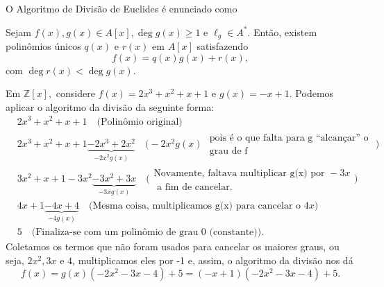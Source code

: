 \documentclass[../algebraIII_notes.tex]{subfiles}
\begin{document}
\begin{tcolorbox}[
		skin=enhanced,
		title=Lembrete!,
		after title={\hfill Algoritmo da Divisão de Euclides},
		fonttitle=\bfseries,
		sharp corners=downhill,
		colframe=black,
		colbacktitle=yellow!75!white,
		colback=yellow!30,
		colbacklower=black,
		coltitle=black,
		drop large lifted shadow
	]
	O \hypertarget{euclides_algorithm}{Algoritmo de Divisão de Euclides} é enunciado como
	\begin{theorem*}
		Sejam \(f(x), g(x)\in A[x], \deg{g(x)}\geq 1\) e \(\ell_{g}\in A^{*}.\) Então,
		existem polinômios únicos \(q(x)\) e \(r(x)\) em \(A[x]\) satisfazendo
		\[
			f(x) = q(x)g(x) + r(x),
		\]
		com \(\deg{r(x)} < \deg{g(x)}.\)
	\end{theorem*}
	\begin{example}
		Em \(\mathbb{Z}[x],\) considere \(f(x) = 2x^{3} + x^{2} + x + 1\)  e \(g(x) = -x + 1.\)
		Podemos aplicar o algoritmo da divisão da seguinte forma:
		\begin{align*}
			 & 2x^{3} + x^{2} + x + 1\quad \text{(Polinômio original)}                                                                                                 \\
			 & 2x^{3} + x^{2} + x + 1 \underbrace{- 2x^{3} + 2x^{2}}_{-2x^{2}g(x)} \quad \bigl(-2x^{2}g(x) \substack{\text{ pois é o que falta para g ``alcançar'' o } \\ \text{ grau de f} }\bigr) \\
			 & 3x^{2} + x + 1 - 3x^{2} \underbrace{- 3x^{2} + 3x}_{-3xg(x)} \quad \bigl(\substack{\text{Novamente, faltava multiplicar g(x) por } -3x                  \\ \text{ a fim de cancelar} .}\bigr) \\
			 & 4x + 1 \underbrace{- 4x + 4}_{-4g(x)} \quad\text{(Mesma coisa, multiplicamos g(x) para cancelar o } 4x)                                                 \\
			 & 5\quad\text{(Finaliza-se com um polinômio de grau 0 (constante)).}
		\end{align*}
		Coletamos os termos que não foram usados para cancelar os maiores graus, ou seja, \(2x^{2}, 3x\) e \(4\), multiplicamos eles por -1 e, assim, o algoritmo da divisão nos dá
		\[
			f(x) = g(x)(-2x^{2} -3x -4) + 5 = (-x+1)(-2x^{2}-3x-4)+5.
		\]
	\end{example}
\end{tcolorbox}
\end{document}
